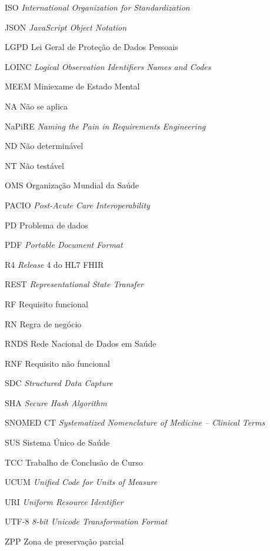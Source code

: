 \begin{siglas}
  \item[ISO] \textit{International Organization for Standardization}
  \item[JSON] \textit{JavaScript Object Notation}
  \item[LGPD] Lei Geral de Proteção de Dados Pessoais
  \item[LOINC] \textit{Logical Observation Identifiers Names and Codes}
  \item[MEEM] Miniexame de Estado Mental
  \item[NA] Não se aplica
  \item[NaPiRE] \textit{Naming the Pain in Requirements Engineering}
  \item[ND] Não determinável
  \item[NT] Não testável
  \item[OMS] Organização Mundial da Saúde
  \item[PACIO] \textit{Post-Acute Care Interoperability}
  \item[PD] Problema de dados
  \item[PDF] \textit{Portable Document Format}
  \item[R4] \textit{Release} 4 do HL7 FHIR
  \item[REST] \textit{Representational State Transfer}
  \item[RF] Requisito funcional
  \item[RN] Regra de negócio
  \item[RNDS] Rede Nacional de Dados em Saúde
  \item[RNF] Requisito não funcional
  \item[SDC] \textit{Structured Data Capture}
  \item[SHA] \textit{Secure Hash Algorithm}
  \item[SNOMED CT] \textit{Systematized Nomenclature of Medicine -- Clinical Terms}
  \item[SUS] Sistema Único de Saúde
  \item[TCC] Trabalho de Conclusão de Curso
  \item[UCUM] \textit{Unified Code for Units of Measure}
  \item[URI] \textit{Uniform Resource Identifier}
  \item[UTF-8] \textit{8-bit Unicode Transformation Format}
  \item[ZPP] Zona de preservação parcial
\end{siglas}
